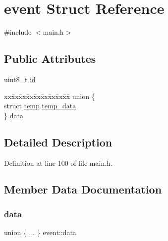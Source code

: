 \hypertarget{structevent}{}\section{event Struct Reference}
\label{structevent}


{\ttfamily \#include $<$main.\+h$>$}

\subsection*{Public Attributes}
\begin{DoxyCompactItemize}
\item 
uint8\+\_\+t \hyperlink{structevent_a270f4da7959257f345b1c43e6056b53c}{id}
\item 
\begin{tabbing}
xx\=xx\=xx\=xx\=xx\=xx\=xx\=xx\=xx\=\kill
union \{\\
\>struct \hyperlink{structtemp}{temp} \hyperlink{structevent_a1091ebe2b1484f3e99aedb48a4b01514}{temp\_data}\\
\} \hyperlink{structevent_a78bc19a07391070a001cd32b7ede572f}{data}\\

\end{tabbing}\end{DoxyCompactItemize}


\subsection{Detailed Description}


Definition at line 100 of file main.\+h.



\subsection{Member Data Documentation}
\mbox{\label{structevent_a78bc19a07391070a001cd32b7ede572f}} 
\subsubsection{\texorpdfstring{data}{data}}
{\footnotesize\ttfamily union \{ ... \}  event\+::data}

\mbox{\label{structevent_a270f4da7959257f345b1c43e6056b53c}} 
